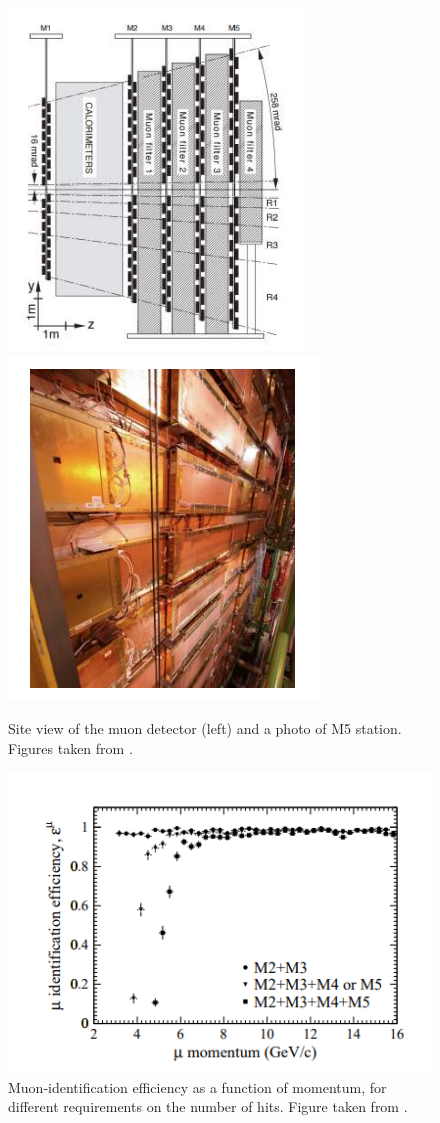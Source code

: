 \begin{figure}[h]
 \begin{center}
  \includegraphics[width=0.49\linewidth]{figures/muon_stations.PNG}
   \includegraphics[width=0.49\linewidth]{figures/muon_photo.PNG}
    \caption{Site view of the muon detector (left) and a photo of M5 station. Figures taken from \cite{lhcb}.}%
    \label{fig:muon}%
 \end{center}
\end{figure}



\begin{figure}[h]
\centering
\includegraphics[scale=0.6]{figures/muon_eff.PNG}
\caption{Muon-identification efficiency as a function of momentum, for different requirements on the number of hits. Figure taken from \cite{muon_tdr}.
\label{fig:muon_missidentify}}
\end{figure}



